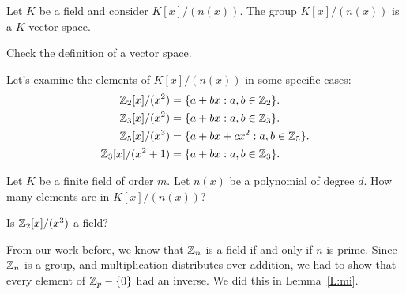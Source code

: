 \documentclass{ximera}
\begin{document}
\begin{lemma}\label{L:mpvs}
  Let $K$ be a field and consider $K[x]/(n(x))$. The group
  $K[x]/(n(x))$ is a $K$-vector space.
  \begin{sketch}
    Check the definition of a vector space.
  \end{sketch}
\end{lemma}


\begin{example}
  Let's examine the elements of $K[x]/(n(x))$ in some specific cases:
  \begin{align*}
    \mathbb Z_2[x]/(x^2) &= \{a + b x: a,b\in \mathbb Z_2\}.\\
    \mathbb Z_3[x]/(x^2) &= \{a + b x: a,b\in \mathbb Z_3\}.\\
    \mathbb Z_5[x]/(x^3) &= \{a + b x + c x^2: a,b\in \mathbb Z_5\}.\\
    \mathbb Z_3[x]/(x^2+1) &= \{a + b x: a,b\in \mathbb Z_3\}.
  \end{align*}
\end{example}

\begin{exercise}
  Let $K$ be a finite field of order $m$. Let $n(x)$ be a polynomial
  of degree $d$. How many elements are in $K[x]/(n(x))$?
\end{exercise}


\begin{exercise}
  Is $\mathbb Z_2[x]/(x^3)$ a field?
\end{exercise}




From our work before, we know that $\mathbb Z_n$ is a field if and only if
$n$ is prime. Since $\mathbb Z_n$ is a group, and multiplication distributes
over addition, we had to show that every element of $\mathbb Z_p-\{0\}$ had
an inverse. We did this in Lemma~\ref{L:mi}.
\end{document}
